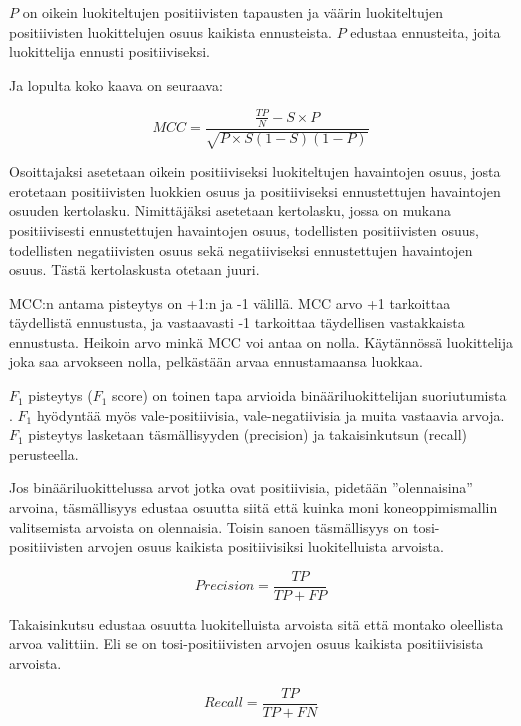 \documentclass[finnish,twoside,openright]{HYgraduMLDS}
\begin{document}
$P$ on oikein luokiteltujen positiivisten tapausten ja väärin luokiteltujen positiivisten luokittelujen osuus kaikista ennusteista. $P$ edustaa ennusteita, joita luokittelija ennusti positiiviseksi.

Ja lopulta koko kaava on seuraava:

\begin{equation} \label{eq:mcc}
    MCC = \frac{\frac{TP}{N} - S \times P}{\sqrt{P \times S (1 - S) (1 - P)}}
\end{equation}

Osoittajaksi asetetaan oikein positiiviseksi luokiteltujen havaintojen osuus, josta erotetaan positiivisten luokkien osuus ja positiiviseksi ennustettujen havaintojen osuuden kertolasku. Nimittäjäksi asetetaan kertolasku, jossa on mukana positiivisesti ennustettujen havaintojen osuus, todellisten positiivisten osuus, todellisten negatiivisten osuus sekä negatiiviseksi ennustettujen havaintojen osuus. Tästä kertolaskusta otetaan juuri.

MCC:n antama pisteytys on +1:n ja -1 välillä. MCC arvo +1 tarkoittaa täydellistä ennustusta, ja vastaavasti -1 tarkoittaa täydellisen vastakkaista ennustusta. Heikoin arvo minkä MCC voi antaa on nolla. Käytännössä luokittelija joka saa arvokseen nolla, pelkästään arvaa ennustamaansa luokkaa.

$F_1$ pisteytys ($F_1$ score) on toinen tapa arvioida binääriluokittelijan suoriutumista \cite{sasaki2007truth}. $F_1$ hyödyntää myös vale-positiivisia, vale-negatiivisia ja muita vastaavia arvoja. $F_1$ pisteytys lasketaan täsmällisyyden (precision) ja takaisinkutsun (recall) perusteella. 

Jos binääriluokittelussa arvot jotka ovat positiivisia, pidetään ''olennaisina'' arvoina, täsmällisyys edustaa osuutta siitä että kuinka moni koneoppimismallin valitsemista arvoista on olennaisia. Toisin sanoen täsmällisyys on tosi-positiivisten arvojen osuus kaikista positiivisiksi luokitelluista arvoista.

\begin{equation} \label{eq:precision}
    Precision = \frac{TP}{TP + FP}
\end{equation}


Takaisinkutsu edustaa osuutta luokitelluista arvoista sitä että montako oleellista arvoa valittiin. Eli se on tosi-positiivisten arvojen osuus kaikista positiivisista arvoista.

\begin{equation} \label{eq:recall}
    Recall = \frac{TP}{TP + FN}
\end{equation}
\end{document}
